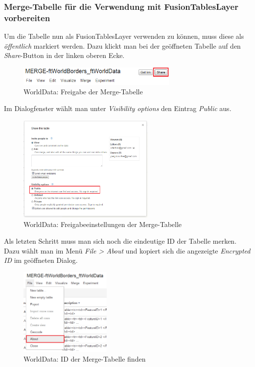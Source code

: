 \subsubsection{Merge-Tabelle für die Verwendung mit FusionTablesLayer vorbereiten}
Um die Tabelle nun als FusionTablesLayer verwenden zu können, muss diese als \emph{öffentlich} markiert werden. Dazu klickt man bei der geöffneten Tabelle auf den \emph{Share}-Button in der linken oberen Ecke.

\begin{figure}[H]
	\centering
	\includegraphics[width=0.7\textwidth]{images/usecase1-worlddata/documentation/worlddata-prepare_fusiontableslayer1}
	\caption{WorldData: Freigabe der Merge-Tabelle}
	\label{worlddata-prepare_fusiontableslayer1}
\end{figure}

Im Dialogfenster wählt man unter \emph{Visibility options} den Eintrag \emph{Public} aus.

\begin{figure}[H]
	\centering
	\includegraphics[width=0.6\textwidth]{images/usecase1-worlddata/documentation/worlddata-prepare_fusiontableslayer2}
	\caption{WorldData: Freigabeeinstellungen der Merge-Tabelle}
	\label{worlddata-prepare_fusiontableslayer2}
\end{figure}

Als letzten Schritt muss man sich noch die eindeutige ID der Tabelle merken. Dazu wählt man im Menü  \emph{File > About} und kopiert sich die angezeigte \emph{Encrypted ID} im geöffneten Dialog.

\begin{figure}[H]
	\centering
	\includegraphics[width=0.4\textwidth]{images/usecase1-worlddata/documentation/worlddata-prepare_fusiontableslayer3}
	\caption{WorldData: ID der Merge-Tabelle finden}
	\label{worlddata-prepare_fusiontableslayer3}
\end{figure}

